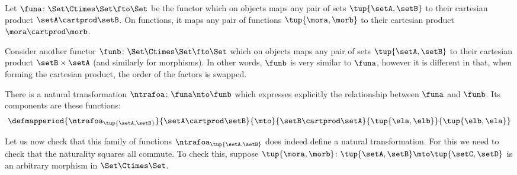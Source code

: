 
\begin{example}
Let $\funa \colon \Set \Ctimes \Set \fto \Set$ be the functor which on objects maps any pair of sets $\tup{\setA, \setB}$ to their cartesian product $\setA \cartprod \setB$. On functions, it maps any pair of functions $\tup{\mora, \morb}$ to their cartesian product $\mora \cartprod \morb$. 

Consider another functor $\funb \colon \Set \Ctimes \Set \fto \Set$ which on objects maps any pair of sets $\tup{\setA, \setB}$ to their cartesian product $\setB \times \setA$ (and similarly for morphisms). In other words, $\funb$ is very similar to $\funa$, however it is different in that, when forming the cartesian product, the order of the factors is swapped. 

There is a natural transformation $\ntrafoa \colon \funa \nto \funb$ which expresses explicitly the relationship between $\funa$ and $\funb$. Its components are these functions: 
    \begin{equation}\label{eq:symmetry-nat-trafo}
        \defmapperiod{\ntrafoa_{\tup{\setA, \setB}}}{\setA \cartprod \setB}{\mto }{\setB \cartprod \setA}{\tup{\ela, \elb}}{\tup{\elb, \ela}}
    \end{equation}

Let us now check that this family of functions $\ntrafoa_{\tup{\setA, \setB}}$ does indeed define a natural transformation. For this we need to check that the naturality squares all commute. To check this, suppose $\tup{\mora, \morb} \colon \tup{\setA, \setB} \mto \tup{\setC, \setD}$ is an arbitrary morphism in $\Set \Ctimes \Set$. 
\end{example}


